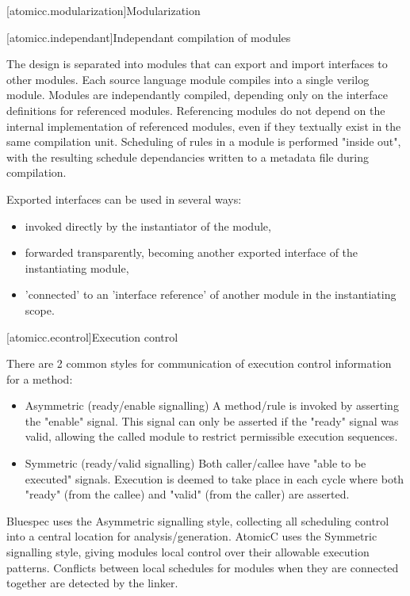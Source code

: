 [atomicc.modularization]{Modularization}

[atomicc.independant]{Independant compilation of modules}

The design is separated into modules that can export and import interfaces to other modules.
Each source language module compiles into a single verilog module.  Modules are independantly
compiled, depending only on the interface definitions for referenced modules.
Referencing modules do not depend on the internal implementation of referenced modules,
even if they textually exist in the same compilation unit.
Scheduling of rules in a module is performed "inside out", with the resulting schedule dependancies written to a metadata file during compilation.

Exported interfaces can be used in several ways:
\begin{itemize}
\item invoked directly by the instantiator of the module,
\item forwarded transparently, becoming another exported interface of the instantiating module,
\item 'connected' to an 'interface reference' of another module in the instantiating scope.
\end{itemize}

[atomicc.econtrol]{Execution control}

There are 2 common styles for communication of execution control information for a method:
\begin{itemize}
\item Asymmetric (ready/enable signalling)
A method/rule is invoked by asserting the "enable" signal.  This signal can only be
asserted if the "ready" signal was valid, allowing the called module to restrict
permissible execution sequences.

\item Symmetric (ready/valid signalling)
Both caller/callee have "able to be executed" signals.  Execution is deemed to take
place in each cycle where both "ready" (from the callee) and "valid" (from the caller)
are asserted.
\end{itemize}

Bluespec uses the Asymmetric signalling style, collecting all scheduling control into a central location for analysis/generation.
AtomicC uses the Symmetric signalling style, giving modules local control over their allowable execution patterns.  Conflicts between local schedules for modules when they are connected together are detected by the linker.

